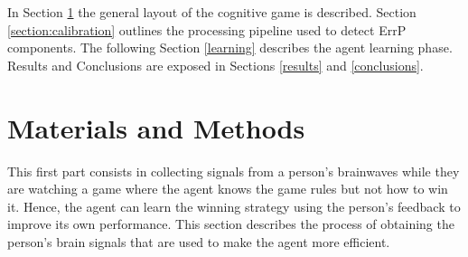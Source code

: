 \documentclass[journal]{IEEEtran}
\begin{document}
%



In Section \ref{section:materials} the general layout of the cognitive game is described. Section \ref{section:calibration} outlines the processing pipeline used to detect ErrP components. The following Section \ref{learning} describes the agent learning phase.   Results and Conclusions are exposed in Sections \ref{results} and \ref{conclusions}.

\section{Materials and Methods}
\label{section:materials}

This first part consists in collecting signals from a person's brainwaves while they are watching a game where the agent knows the game rules but not how to win it. Hence, the agent can learn the winning strategy using the person's feedback to improve its own performance. This section describes the process of obtaining the person's brain signals that are used to make the agent more efficient.
\end{document}
